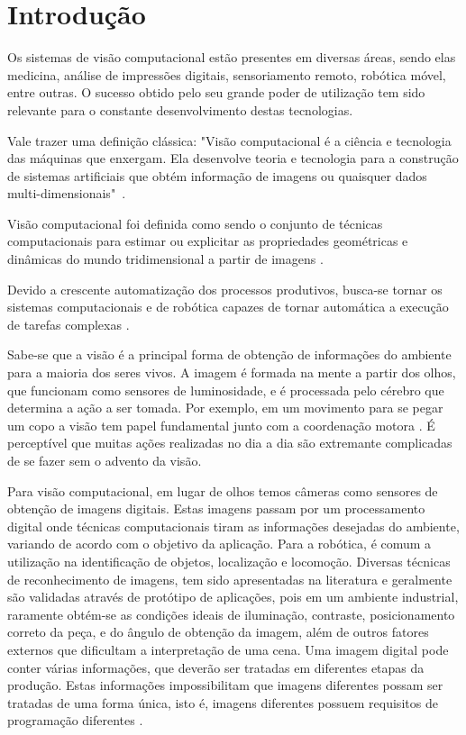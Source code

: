 \chapter{Introdução}
\label{chap:intro}

Os sistemas de visão computacional estão presentes em diversas áreas, sendo elas medicina, análise de impressões digitais, sensoriamento remoto, robótica móvel, entre outras. O sucesso obtido pelo seu grande poder de utilização tem sido relevante para o constante desenvolvimento destas tecnologias.

Vale trazer uma definição clássica: "Visão computacional é a ciência e tecnologia das máquinas que enxergam. Ela desenvolve teoria e tecnologia para a construção de sistemas artificiais que obtém informação de imagens ou quaisquer dados multi-dimensionais"~\cite{antonello2014introduccao}.

Visão computacional foi definida como sendo o conjunto de técnicas computacionais para estimar ou explicitar as propriedades geométricas e dinâmicas do mundo tridimensional a partir de imagens \cite{alves2005estudo}.

Devido a crescente automatização dos processos produtivos, busca-se tornar os sistemas computacionais e de robótica capazes de tornar automática a execução de tarefas complexas \cite{rudek2001visao}.

Sabe-se que a visão é a principal forma de obtenção de informações do ambiente para a maioria dos seres vivos. A imagem é formada na mente a partir dos olhos, que funcionam como sensores de luminosidade, e é processada pelo cérebro que determina a ação a ser tomada. Por exemplo, em um movimento para se pegar um copo a visão tem papel fundamental junto com a coordenação motora \cite{alves2005estudo}. É perceptível que muitas ações realizadas no dia a dia são extremante complicadas de se fazer sem o advento da visão.

Para visão computacional, em lugar de olhos temos câmeras como sensores de obtenção de imagens digitais. Estas imagens passam por um processamento digital onde técnicas computacionais tiram as informações desejadas do ambiente, variando de acordo com o objetivo da aplicação. Para a robótica, é comum a utilização na identificação de objetos, localização e locomoção. Diversas técnicas de reconhecimento de imagens, tem sido apresentadas na literatura e geralmente são validadas através de protótipo de aplicações, pois em um ambiente industrial, raramente obtém-se as condições ideais de iluminação, contraste, posicionamento correto da peça, e do ângulo de obtenção da imagem, além de outros fatores externos que dificultam a interpretação de uma cena. Uma imagem digital pode conter várias informações, que deverão ser tratadas em diferentes etapas da produção. Estas informações impossibilitam que imagens diferentes possam ser tratadas de uma forma única, isto é, imagens diferentes possuem requisitos de programação diferentes \cite{rudek2001visao}.

